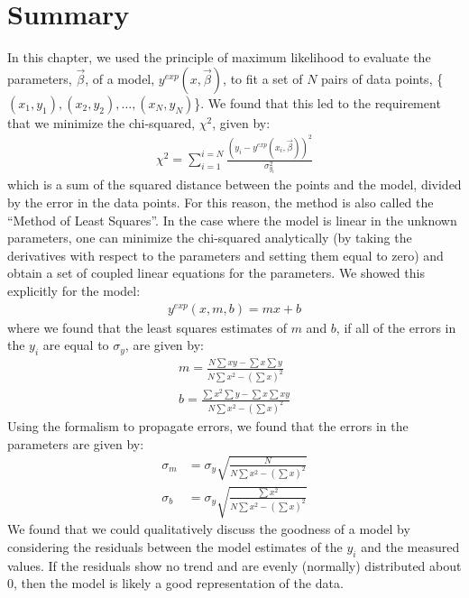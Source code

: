 
\clearpage
\section{Summary}
In this chapter, we used the principle of maximum likelihood to evaluate the parameters, $\vec\beta$, of a model, $y^{exp}(x,\vec\beta)$, to fit a set of $N$ pairs of data points, \{$(x_1,y_1), (x_2,y_2), \dots, (x_N,y_N)$\}. We found that this led to the requirement that we minimize the chi-squared, $\chi^2$, given by:
\begin{align}
\chi^2=\sum_{i=1}^{i=N}\frac{(y_i-y^{exp}(x_i,\vec\beta))^2}{\sigma_{y_i}^2}
\end{align}
which is a sum of the squared distance between the points and the model, divided by the error in the data points. For this reason, the method is also called the ``Method of Least Squares''. In the case where the model is linear in the unknown parameters, one can minimize the chi-squared analytically (by taking the derivatives with respect to the parameters and setting them equal to zero) and obtain a set of coupled linear equations for the parameters. We showed this explicitly for the model:
\begin{align}
y^{exp}(x,m,b)=mx+b
\end{align}
where we found that the least squares estimates of $m$ and $b$, if all of the errors in the $y_i$ are equal to $\sigma_y$, are given by:
\begin{align}
m=\frac{N\sum xy-\sum x\sum y}{N\sum x^2-\left(\sum x\right)^2}\nonumber\\
b=\frac{\sum x^2\sum y-\sum x \sum xy}{N\sum x^2-\left(\sum x\right)^2}
\end{align}
Using the formalism to propagate errors, we found that the errors in the parameters are given by:
\begin{align}
\sigma_m&=\sigma_y\sqrt{\frac{N}{N\sum x^2-\left(\sum x\right)^2}}\nonumber\\
\sigma_b&=\sigma_y\sqrt{\frac{\sum x^2}{N\sum x^2-\left(\sum x\right)^2}}
\end{align}
We found that we could qualitatively discuss the goodness of a model by considering the residuals between the model estimates of the $y_i$ and the measured values. If the residuals show no trend and are evenly (normally) distributed about 0, then the model is likely a good representation of the data.

